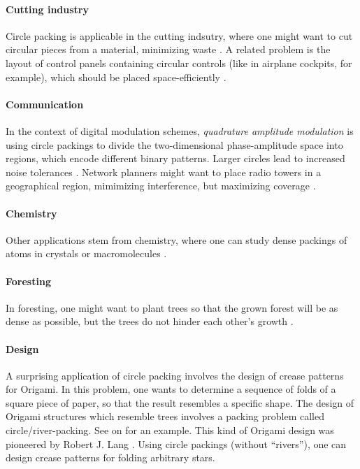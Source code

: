 \documentclass[a4paper,style=print,oneside,bibliography=totoc,nexus,lnum,extramargin]{tubsbook}
\begin{document}
\paragraph{Cutting industry}

Circle packing is applicable in the cutting indsutry, where one might want to cut circular pieces from a material, minimizing waste \cite{SMCSCG2007new}.
A related problem is the layout of control panels containing circular controls (like in airplane cockpits, for example), which should be placed space-efficiently \parencite{CKP2008solving}.

\paragraph{Communication}

In the context of digital modulation schemes, \emph{quadrature amplitude modulation} is using circle packings to divide the two-dimensional phase-amplitude space into regions, which encode different binary patterns. Larger circles lead to increased noise tolerances \parencite{PWMD1992packing}.
Network planners might want to place radio towers in a geographical region, mimimizing interference, but maximizing coverage \parencite{SMCSCG2007new}.

\paragraph{Chemistry}

Other applications stem from chemistry, where one can study dense packings of atoms in crystals or macromolecules \cite{WMP1994history}.

\paragraph{Foresting}

In foresting, one might want to plant trees so that the grown forest will be as dense as possible, but the trees do not hinder each other's growth \cite{SMCSCG2007new}.

\paragraph{Design}

A surprising application of circle packing involves the design of crease patterns for Origami. In this problem, one wants to determine a sequence of folds of a square piece of paper, so that the result resembles a specific shape. The design of Origami structures which resemble trees involves a packing problem called circle/river-packing. See  on  for an example. This kind of Origami design was pioneered by Robert J. Lang \cite{lang1996computational}. Using circle packings (without “rivers”), one can design crease patterns for folding arbitrary stars.
\end{document}
